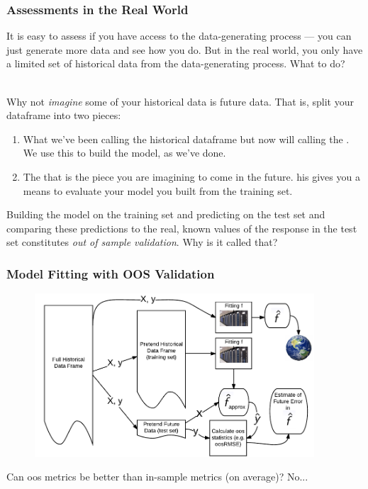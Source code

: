 \documentclass[handout]{beamer}
\begin{document}
\begin{frame}\frametitle{Assessments in the Real World}
\small
It is easy to assess if you have access to the data-generating process --- you can just generate more data and see how you do. But in the real world, you only have a limited set of historical data from the data-generating process. What to do?\\~\\ \pause

Why not \textit{imagine} some of your historical data is future data. That is, split your dataframe into two pieces: \pause

\begin{enumerate}
\item What we've been calling the historical dataframe but now will calling the . We use this to build the model, as we've done. \pause
\item The  that is the piece you are imagining to come in the future. his gives you a means to evaluate your model you built from the training set. \pause
\end{enumerate}

Building the model on the training set and predicting on the test set and comparing these predictions to the real, known values of the response in the test set constitutes \textit{out of sample validation}. Why is it called that?

\end{frame}

\begin{frame}\frametitle{Model Fitting with OOS Validation}

\begin{figure}
\centering
\includegraphics[width=4.1in]{oos_validation}
\end{figure}

Can oos metrics be better than in-sample metrics (on average)? \pause No...
\end{frame}
\end{document}
